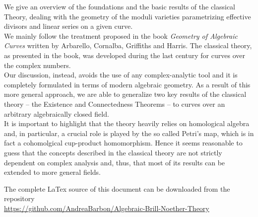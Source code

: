 


\begin{abstracts}         %

	We give an overview of the foundations and the basic results of the classical \BN Theory, dealing with the geometry of the moduli varieties parametrizing effective divisors and linear series on a given curve.\\
	We mainly follow the treatment proposed in the book \emph{Geometry of Algebraic Curves} written by Arbarello, Cornalba, Griffiths and Harris. 
	The classical theory, as presented in the book, was developed during the last century for curves over the complex numbers.\\ 
	Our discussion, instead, avoids the use of any complex-analytic tool and it is completely formulated in terms of modern algebraic geometry. As a result of this more general approach, we are able to generalize two key results of the classical theory -- the Existence and Connectedness Theorems -- to curves over an arbitrary algebraically closed field.\\
	It is important to highlight that the \BN theory heavily relies on homological algebra and, in particular, a crucial role is played by the so called Petri's map, which is in fact a cohomolgical cup-product homomorphism. Hence it seems reasonable to guess that the concepts described in the classical theory are not strictly dependent on complex analysis and, thus, that most of its results can be extended to more general fields.
	\vspace{12em}
	\begin{center}
		\footnotesize{
			The complete LaTex source of this document can be downloaded from the repository \\ 
			\href{https://github.com/AndreaBarbon/Algebraic-Brill-Noether-Theory}{https://github.com/AndreaBarbon/Algebraic-Brill-Noether-Theory}
		}
	\end{center}

\end{abstracts}


